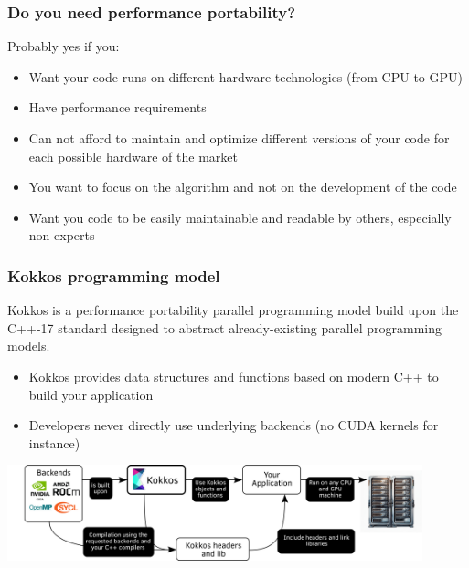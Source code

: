 \documentclass[aspectratio=169]{beamer}
\begin{document}
\begin{frame}
\frametitle{Do you need performance portability?}
Probably yes if you:
\begin{itemize}
    \item Want your code runs on different hardware technologies (from CPU to GPU)
    \item Have performance requirements
    \item Can not afford to maintain and optimize different versions of your code for each possible hardware of the market
    \item You want to focus on the algorithm and not on the development of the code
    \item Want you code to be easily maintainable and readable by others, especially non experts
\end{itemize}

\end{frame}


\begin{frame}
    \frametitle{Kokkos programming model}

    Kokkos is a performance portability parallel programming model build upon the C++-17 standard designed to abstract already-existing parallel programming models.

    \hspace{0.5cm}

    \begin{itemize}
        \item Kokkos provides data structures and functions based on modern C++ to build your application
        \item Developers never directly use underlying backends (no CUDA kernels for instance)
    \end{itemize}

    \begin{center}
        \includegraphics[width=0.9\textwidth]{../../images/kokkos_model.png}
    \end{center}

\end{frame}
\end{document}
